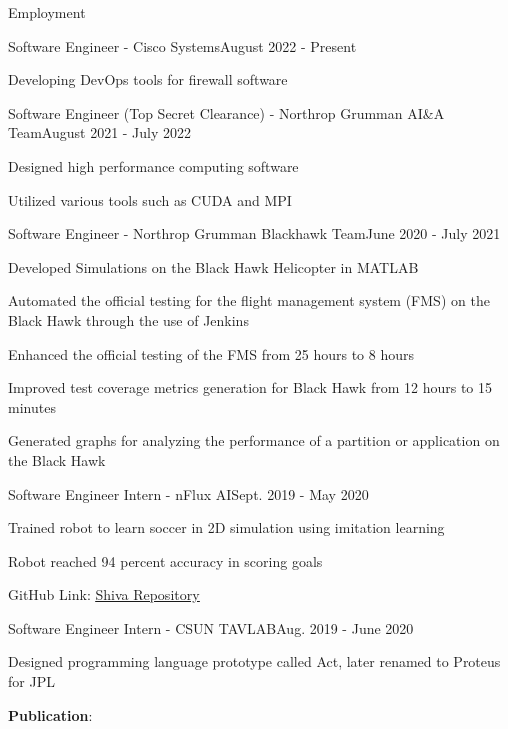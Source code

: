 \documentclass{resume}
\begin{document}
\begin{rSection}{Employment}
    \begin{rSubsection}{Software Engineer - Cisco Systems}{August 2022 - Present}
        \item Developing DevOps tools for firewall software
    \end{rSubsection}
    \begin{rSubsection}{Software Engineer (Top Secret Clearance) - Northrop Grumman AI\&A Team}{August 2021 - July 2022}
        \item Designed high performance computing software
        \item Utilized various tools such as CUDA and MPI
    \end{rSubsection}
    \begin{rSubsection}{Software Engineer - Northrop Grumman Blackhawk Team}{June 2020 - July 2021}
        \item Developed Simulations on the Black Hawk Helicopter in MATLAB
        \item Automated the official testing for the flight management system (FMS) on the Black Hawk through the use of Jenkins
        \item Enhanced the official testing of the FMS from 25 hours to 8 hours
        \item Improved test coverage metrics generation for Black Hawk from 12 hours to 15 minutes
        \item Generated graphs for analyzing the performance of a partition or application on the Black Hawk
    \end{rSubsection}
    \begin{rSubsection}{Software Engineer Intern - nFlux AI}{Sept. 2019 - May 2020}
        \item Trained robot to learn soccer in 2D simulation using imitation learning
        \item Robot reached 94 percent accuracy in scoring goals
        \item GitHub Link: \href{https://github.com/nflux/Shiva}{\color{blue}\underline{Shiva Repository}}
    \end{rSubsection}
    \begin{rSubsection}{Software Engineer Intern - CSUN TAVLAB}{Aug. 2019 - June 2020}
        \item Designed programming language prototype called Act, later renamed to Proteus for JPL
        \item \textbf{Publication}: \\

\end{rSubsection}
\end{rSection}
\end{document}
